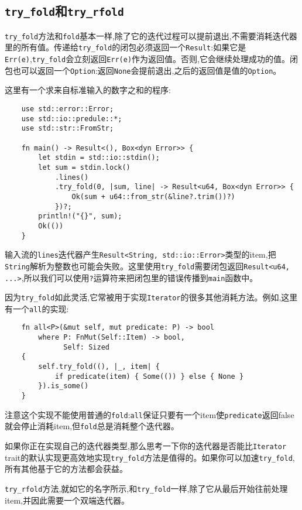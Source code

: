\subsection{\texttt{try\_fold}和\texttt{try\_rfold}}
\texttt{try\_fold}方法和\texttt{fold}基本一样,除了它的迭代过程可以提前退出,不需要消耗迭代器里的所有值。传递给\texttt{try\_fold}的闭包必须返回一个\texttt{Result}:如果它是\texttt{Err(e)},\texttt{try\_fold}会立刻返回\texttt{Err(e)}作为返回值。否则,它会继续处理成功的值。闭包也可以返回一个\texttt{Option}:返回\texttt{None}会提前退出,之后的返回值是值的\texttt{Option}。

这里有一个求来自标准输入的数字之和的程序:
\begin{verbatim}
    use std::error::Error;
    use std::io::predule::*;
    use std::str::FromStr;

    fn main() -> Result<(), Box<dyn Error>> {
        let stdin = std::io::stdin();
        let sum = stdin.lock()
            .lines()
            .try_fold(0, |sum, line| -> Result<u64, Box<dyn Error>> {
                Ok(sum + u64::from_str(&line?.trim())?)
            })?;
        println!("{}", sum);
        Ok(())
    }
\end{verbatim}

输入流的\texttt{lines}迭代器产生\texttt{Result<String, std::io::Error>}类型的item,把\texttt{String}解析为整数也可能会失败。这里使用\texttt{try\_fold}需要闭包返回\texttt{Result<u64, ...>},所以我们可以使用\texttt{?}运算符来把闭包里的错误传播到\texttt{main}函数中。

因为\texttt{try\_fold}如此灵活,它常被用于实现\texttt{Iterator}的很多其他消耗方法。例如,这里有一个\texttt{all}的实现:
\begin{verbatim}
    fn all<P>(&mut self, mut predicate: P) -> bool
        where P: FnMut(Self::Item) -> bool,
              Self: Sized
    {
        self.try_fold((), |_, item| {
            if predicate(item) { Some(()) } else { None }
        }).is_some()
    }
\end{verbatim}

注意这个实现不能使用普通的\texttt{fold}:\texttt{all}保证只要有一个item使\texttt{predicate}返回false就会停止消耗item,但\texttt{fold}总是消耗整个迭代器。

如果你正在实现自己的迭代器类型,那么思考一下你的迭代器是否能比\texttt{Iterator} trait的默认实现更高效地实现\texttt{try\_fold}方法是值得的。如果你可以加速\texttt{try\_fold},所有其他基于它的方法都会获益。

\texttt{try\_rfold}方法,就如它的名字所示,和\texttt{try\_fold}一样,除了它从最后开始往前处理item,并因此需要一个双端迭代器。

